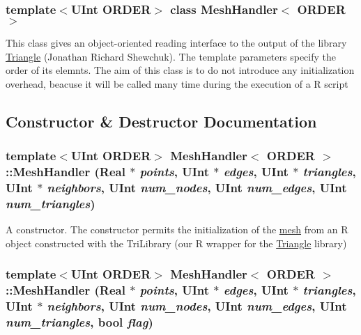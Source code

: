 \subsubsection*{template$<$UInt ORDER$>$ class MeshHandler$<$ ORDER $>$}

This class gives an object-\/oriented reading interface to the output of the library \hyperlink{classTriangle}{Triangle} (Jonathan Richard Shewchuk). The template parameters specify the order of its elemnts. The aim of this class is to do not introduce any initialization overhead, beacuse it will be called many time during the execution of a R script 

\subsection{Constructor \& Destructor Documentation}
\hypertarget{classMeshHandler_a983560a8f515c91a25a13d7d14b751c2}{
\subsubsection[{MeshHandler}]{\setlength{\rightskip}{0pt plus 5cm}template$<$UInt ORDER$>$ {\bf MeshHandler}$<$ ORDER $>$::{\bf MeshHandler} (Real $\ast$ {\em points}, \/  UInt $\ast$ {\em edges}, \/  UInt $\ast$ {\em triangles}, \/  UInt $\ast$ {\em neighbors}, \/  UInt {\em num\_\-nodes}, \/  UInt {\em num\_\-edges}, \/  UInt {\em num\_\-triangles})}}
\label{classMeshHandler_a983560a8f515c91a25a13d7d14b751c2}


A constructor. The constructor permits the initialization of the \hyperlink{structmesh}{mesh} from an R object constructed with the TriLibrary (our R wrapper for the \hyperlink{classTriangle}{Triangle} library) \hypertarget{classMeshHandler_a07339e31fd7550c9a9f8a99deba34074}{
\subsubsection[{MeshHandler}]{\setlength{\rightskip}{0pt plus 5cm}template$<$UInt ORDER$>$ {\bf MeshHandler}$<$ ORDER $>$::{\bf MeshHandler} (Real $\ast$ {\em points}, \/  UInt $\ast$ {\em edges}, \/  UInt $\ast$ {\em triangles}, \/  UInt $\ast$ {\em neighbors}, \/  UInt {\em num\_\-nodes}, \/  UInt {\em num\_\-edges}, \/  UInt {\em num\_\-triangles}, \/  bool {\em flag})}}
\label{classMeshHandler_a07339e31fd7550c9a9f8a99deba34074}


